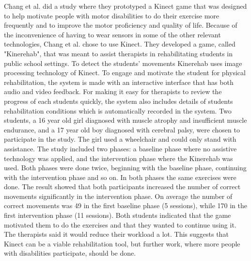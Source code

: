Chang et al. did a study where they prototyped a Kinect game that was designed to help motivate people with motor disabilities to do their exercise more frequently and to improve the motor proficiency and quality of life. Because of the inconvenience of having to wear sensors in some of the other relevant technologies, Chang et al. chose to use Kinect. They developed a game, called "Kinerehab", that was meant to assist therapists in rehabilitating students in public school settings. To detect the students’ movements Kinerehab uses image processing technology of Kinect. To engage and motivate the student for physical rehabilitation, the system is made with an interactive interface that has both audio and video feedback. For making it easy for therapists to review the progress of each students quickly, the system also includes details of students rehabilitation conditions which is automatically recorded in the system. Two students, a 16 year old girl diagnosed with  muscle atrophy and insufficient muscle endurance, and a 17 year old boy diagnosed with cerebral palsy, were chosen to participate in the study. The girl used a wheelchair and could only stand with assistance. The study included two phases: a baseline phase  where no assistive technology was applied, and the intervention phase where the Kinerehab was used. Both phases were done twice, beginning with the baseline phase, continuing with the intervention phase and so on. In both phases the same exercises were done. The result showed that both participants increased the number of correct movements significantly in the intervention phase. On average the number of correct movements was 49 in the first baseline phase (5 sessions), while 170 in the first intervention phase (11 sessions). Both students indicated that the game motivated them to do the exercises and that they wanted to continue using it. The therapists said it would reduce their workload a lot. This suggests that Kinect can be a viable rehabilitation tool, but further work, where more people with disabilities participate, should be done. \cite{kinect} \\ \\ 
